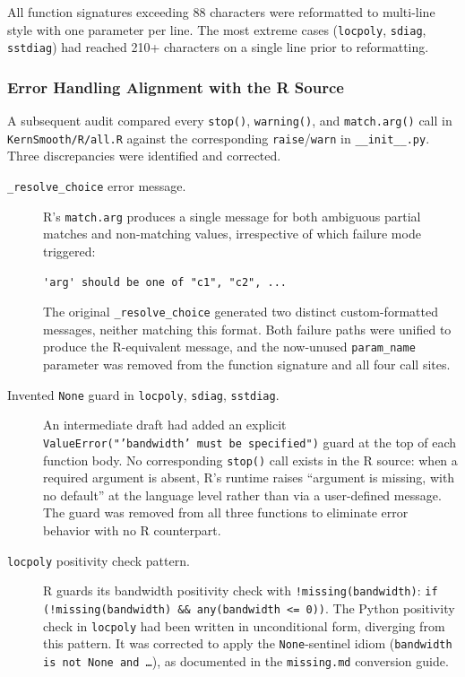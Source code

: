 \documentclass[12pt,a4paper]{article}
\begin{document}
All function signatures exceeding 88 characters were reformatted to multi-line style with one parameter per line. The most extreme cases (\texttt{locpoly}, \texttt{sdiag}, \texttt{sstdiag}) had reached 210+ characters on a single line prior to reformatting.

\subsubsection{Error Handling Alignment with the R Source}
\label{sec:phase5-r-alignment}

A subsequent audit compared every \texttt{stop()}, \texttt{warning()}, and \texttt{match.arg()} call in \texttt{KernSmooth/R/all.R} against the corresponding \texttt{raise}/\texttt{warn} in \texttt{\_\_init\_\_.py}. Three discrepancies were identified and corrected.

\begin{description}
  \item[\texttt{\_resolve\_choice} error message.]
    R's \texttt{match.arg} produces a single message for both ambiguous partial matches and non-matching values, irrespective of which failure mode triggered:
    \begin{lstlisting}[style=shell]
'arg' should be one of "c1", "c2", ...
    \end{lstlisting}
    The original \texttt{\_resolve\_choice} generated two distinct custom-formatted messages, neither matching this format. Both failure paths were unified to produce the R-equivalent message, and the now-unused \texttt{param\_name} parameter was removed from the function signature and all four call sites.

  \item[Invented \texttt{None} guard in \texttt{locpoly}, \texttt{sdiag}, \texttt{sstdiag}.]
    An intermediate draft had added an explicit \texttt{ValueError("'bandwidth'~must~be~specified")} guard at the top of each function body. No corresponding \texttt{stop()} call exists in the R source: when a required argument is absent, R's runtime raises ``argument is missing, with no default'' at the language level rather than via a user-defined message. The guard was removed from all three functions to eliminate error behavior with no R counterpart.

  \item[\texttt{locpoly} positivity check pattern.]
    R guards its bandwidth positivity check with \texttt{!missing(bandwidth)}: \texttt{if (!missing(bandwidth) \&\& any(bandwidth <= 0))}. The Python positivity check in \texttt{locpoly} had been written in unconditional form, diverging from this pattern. It was corrected to apply the \texttt{None}-sentinel idiom (\texttt{bandwidth is not None and \ldots}), as documented in the \texttt{missing.md} conversion guide.
\end{description}
\end{document}
